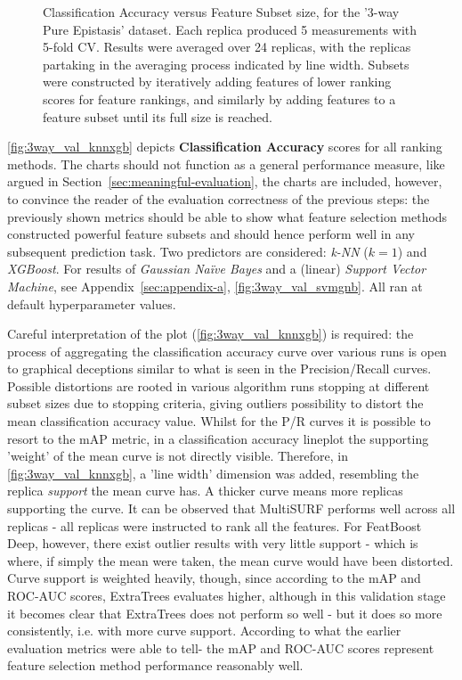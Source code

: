 \documentclass{article}
\begin{document}
\begin{figure}[ht]
\centering

\caption{Classification Accuracy versus Feature Subset size, for the '3-way  Pure  Epistasis' dataset. Each replica produced 5 measurements with 5-fold CV. Results were averaged over 24 replicas, with the replicas partaking in the averaging process indicated by line width. Subsets were constructed by iteratively adding features of lower ranking scores for feature rankings, and similarly by adding features to a feature subset until its full size is reached.}
\label{fig:3way_val_knnxgb}
\end{figure}

\autoref{fig:3way_val_knnxgb} depicts \textbf{Classification Accuracy} scores for all ranking methods. The charts should not function as a general performance measure, like argued in Section~\ref{sec:meaningful-evaluation}, the charts are included, however, to convince the reader of the evaluation correctness of the previous steps: the previously shown metrics should be able to show what feature selection methods constructed powerful feature subsets and should hence perform well in any subsequent prediction task. Two predictors are considered: \textit{k-NN} ($k = 1$) and \textit{XGBoost}. For results of \textit{Gaussian Naïve Bayes} and  a (linear) \textit{Support Vector Machine}, see Appendix~\ref{sec:appendix-a}, \autoref{fig:3way_val_svmgnb}. All ran at default hyperparameter values.

Careful interpretation of the plot (\autoref{fig:3way_val_knnxgb}) is required: the process of aggregating the classification accuracy curve over various runs is open to graphical deceptions similar to what is seen in the Precision/Recall curves. Possible distortions are rooted in various algorithm runs stopping at different subset sizes due to stopping criteria, giving outliers possibility to distort the mean classification accuracy value. Whilst for the P/R curves it is possible to resort to the mAP metric, in a classification accuracy lineplot the supporting 'weight' of the mean curve is not directly visible. Therefore, in \autoref{fig:3way_val_knnxgb}, a 'line width' dimension was added, resembling the replica \textit{support} the mean curve has. A thicker curve means more replicas supporting the curve. It can be observed that MultiSURF performs well across all replicas - all replicas were instructed to rank all the features. For FeatBoost Deep, however, there exist outlier results with very little support - which is where, if simply the mean were taken, the mean curve would have been distorted. Curve support is weighted heavily, though, since according to the mAP and ROC-AUC scores, ExtraTrees evaluates higher, although in this validation stage it becomes clear that ExtraTrees does not perform so well - but it does so more consistently, i.e. with more curve support. According to what the earlier evaluation metrics were able to tell- the mAP and ROC-AUC scores represent feature selection method performance reasonably well.
\end{document}
